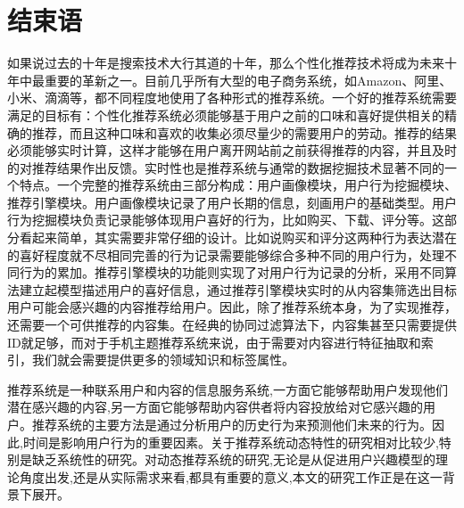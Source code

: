 
\chapter{结束语}
  如果说过去的十年是搜索技术大行其道的十年，那么个性化推荐技术将成为未来十年中最重要的革新之一。目前几乎所有大型的电子商务系统，如Amazon、阿里、小米、滴滴等，都不同程度地使用了各种形式的推荐系统。一个好的推荐系统需要满足的目标有：个性化推荐系统必须能够基于用户之前的口味和喜好提供相关的精确的推荐，而且这种口味和喜欢的收集必须尽量少的需要用户的劳动。推荐的结果必须能够实时计算，这样才能够在用户离开网站前之前获得推荐的内容，并且及时的对推荐结果作出反馈。实时性也是推荐系统与通常的数据挖掘技术显著不同的一个特点。一个完整的推荐系统由三部分构成：用户画像模块，用户行为挖掘模块、推荐引擎模块。用户画像模块记录了用户长期的信息，刻画用户的基础类型。用户行为挖掘模块负责记录能够体现用户喜好的行为，比如购买、下载、评分等。这部分看起来简单，其实需要非常仔细的设计。比如说购买和评分这两种行为表达潜在的喜好程度就不尽相同完善的行为记录需要能够综合多种不同的用户行为，处理不同行为的累加。推荐引擎模块的功能则实现了对用户行为记录的分析，采用不同算法建立起模型描述用户的喜好信息，通过推荐引擎模块实时的从内容集筛选出目标用户可能会感兴趣的内容推荐给用户。因此，除了推荐系统本身，为了实现推荐，还需要一个可供推荐的内容集。在经典的协同过滤算法下，内容集甚至只需要提供ID就足够，而对于手机主题推荐系统来说，由于需要对内容进行特征抽取和索引，我们就会需要提供更多的领域知识和标签属性。

  推荐系统是一种联系用户和内容的信息服务系统,一方面它能够帮助用户发现他们潜在感兴趣的内容,另一方面它能够帮助内容供者将内容投放给对它感兴趣的用户。推荐系统的主要方法是通过分析用户的历史行为来预测他们未来的行为。因此,时间是影响用户行为的重要因素。关于推荐系统动态特性的研究相对比较少,特别是缺乏系统性的研究。对动态推荐系统的研究,无论是从促进用户兴趣模型的理论角度出发,还是从实际需求来看,都具有重要的意义,本文的研究工作正是在这一背景下展开。

